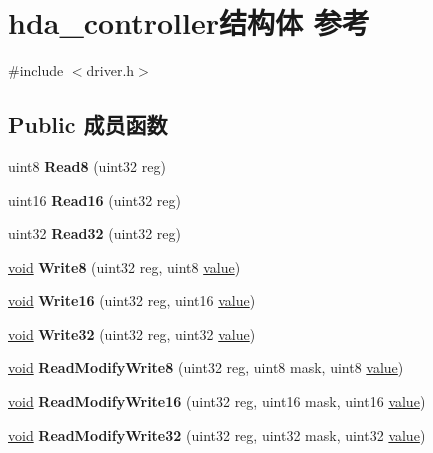 \hypertarget{structhda__controller}{}\section{hda\+\_\+controller结构体 参考}
\label{structhda__controller}


{\ttfamily \#include $<$driver.\+h$>$}

\subsection*{Public 成员函数}
\begin{DoxyCompactItemize}
\item 
\mbox{\label{structhda__controller_a957cad4bc41d3f5ba780b8825096665f}} 
uint8 {\bfseries Read8} (uint32 reg)
\item 
\mbox{\label{structhda__controller_ae23c960f87244567852a320f498b26b9}} 
uint16 {\bfseries Read16} (uint32 reg)
\item 
\mbox{\label{structhda__controller_a5824ea92dc0f57c10093eaedf36dab55}} 
uint32 {\bfseries Read32} (uint32 reg)
\item 
\mbox{\label{structhda__controller_a0b518a3f5d6c286ec5ffba5b4ff59059}} 
\hyperlink{interfacevoid}{void} {\bfseries Write8} (uint32 reg, uint8 \hyperlink{unionvalue}{value})
\item 
\mbox{\label{structhda__controller_aaecbabd53e4281e856cc8acfe14e46f7}} 
\hyperlink{interfacevoid}{void} {\bfseries Write16} (uint32 reg, uint16 \hyperlink{unionvalue}{value})
\item 
\mbox{\label{structhda__controller_a74b9dd74f31e48b38066ab056d416665}} 
\hyperlink{interfacevoid}{void} {\bfseries Write32} (uint32 reg, uint32 \hyperlink{unionvalue}{value})
\item 
\mbox{\label{structhda__controller_a64bc9830b70e2a99614a7a81477b6cdd}} 
\hyperlink{interfacevoid}{void} {\bfseries Read\+Modify\+Write8} (uint32 reg, uint8 mask, uint8 \hyperlink{unionvalue}{value})
\item 
\mbox{\label{structhda__controller_a9b2cf3e8510592c24f6af8242d62711c}} 
\hyperlink{interfacevoid}{void} {\bfseries Read\+Modify\+Write16} (uint32 reg, uint16 mask, uint16 \hyperlink{unionvalue}{value})
\item 
\mbox{\label{structhda__controller_aa7c31978a2a12f9c741d9c765fdd9f42}} 
\hyperlink{interfacevoid}{void} {\bfseries Read\+Modify\+Write32} (uint32 reg, uint32 mask, uint32 \hyperlink{unionvalue}{value})
\end{DoxyCompactItemize}
